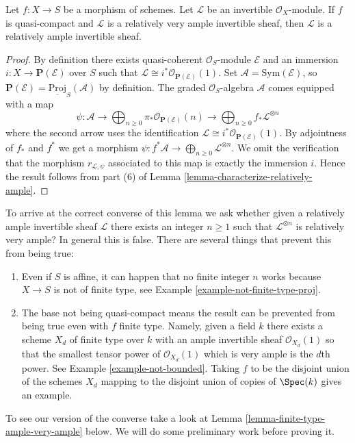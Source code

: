 \begin{lemma}
\label{lemma-ample-very-ample}
\begin{reference}
\cite[II, Proposition 4.6.2]{EGA}
\end{reference}
Let $f : X \to S$ be a morphism of schemes.
Let $\mathcal{L}$ be an invertible $\mathcal{O}_X$-module.
If $f$ is quasi-compact and $\mathcal{L}$ is a relatively
very ample invertible sheaf, then $\mathcal{L}$ is a relatively
ample invertible sheaf.
\end{lemma}

\begin{proof}
By definition there exists quasi-coherent $\mathcal{O}_S$-module
$\mathcal{E}$ and an immersion $i : X \to \mathbf{P}(\mathcal{E})$
over $S$ such that
$\mathcal{L} \cong i^*\mathcal{O}_{\mathbf{P}(\mathcal{E})}(1)$.
Set $\mathcal{A} = \text{Sym}(\mathcal{E})$, so
$\mathbf{P}(\mathcal{E}) = \underline{\text{Proj}}_S(\mathcal{A})$
by definition. The graded $\mathcal{O}_S$-algebra $\mathcal{A}$
comes equipped with a map
$$
\psi :
\mathcal{A} \to
\bigoplus\nolimits_{n \geq 0}
\pi_*\mathcal{O}_{\mathbf{P}(\mathcal{E})}(n) \to
\bigoplus\nolimits_{n \geq 0}
f_*\mathcal{L}^{\otimes n}
$$
where the second arrow uses the identification
$\mathcal{L} \cong i^*\mathcal{O}_{\mathbf{P}(\mathcal{E})}(1)$.
By adjointness of $f_*$ and $f^*$ we get a morphism
$\psi : f^*\mathcal{A} \to \bigoplus_{n \geq 0}\mathcal{L}^{\otimes n}$.
We omit the verification that the morphism $r_{\mathcal{L}, \psi}$
associated to this map is exactly the immersion $i$.
Hence the result follows from
part (6) of Lemma \ref{lemma-characterize-relatively-ample}.
\end{proof}

\noindent
To arrive at the correct converse of this lemma we ask
whether given a relatively ample
invertible sheaf $\mathcal{L}$ there exists an integer $n \geq 1$ such
that $\mathcal{L}^{\otimes n}$ is relatively very ample? In general this
is false. There are several things that prevent this from being true:
\begin{enumerate}
\item Even if $S$ is affine, it can happen that no finite integer
$n$ works because $X \to S$ is not of finite type, see
Example \ref{example-not-finite-type-proj}.
\item The base not being quasi-compact means the result can be
prevented from being true even with $f$ finite type. Namely, given
a field $k$ there exists a scheme $X_d$ of finite type over $k$ with
an ample invertible sheaf $\mathcal{O}_{X_d}(1)$ so that the smallest
tensor power of $\mathcal{O}_{X_d}(1)$ which is very ample is the $d$th
power. See Example \ref{example-not-bounded}.
Taking $f$ to be the disjoint union of the schemes $X_d$ mapping
to the disjoint union of copies of $\Spec(k)$ gives an example.
\end{enumerate}
To see our version of the converse take a look at
Lemma \ref{lemma-finite-type-ample-very-ample} below.
We will do some preliminary work before proving it.

